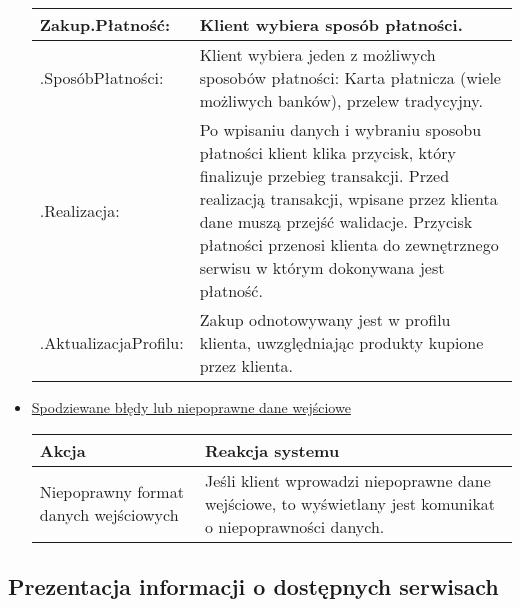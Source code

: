 \documentclass[a4paper,20pt]{article}
\begin{document}
\begin{itemize}
\begin{center}
\begin{tabularx}{\textwidth}[t]{XX}
\arrayrulecolor{black}\hline
\textbf{Zakup.Płatność:} & \textbf{Klient wybiera sposób płatności.} \\

\hline

\quad .SposóbPłatności: & 
\begin{minipage}[t]{\linewidth}%
Klient wybiera jeden z możliwych sposobów płatności: Karta płatnicza (wiele możliwych banków), przelew tradycyjny. 
\end{minipage}\\

\quad .Realizacja: & 
\begin{minipage}[t]{\linewidth}%
Po wpisaniu danych i wybraniu sposobu płatności klient klika przycisk, który finalizuje przebieg transakcji. Przed realizacją transakcji, wpisane przez klienta dane muszą przejść walidacje. Przycisk płatności przenosi klienta do zewnętrznego serwisu w którym dokonywana jest płatność.  
\end{minipage}\\

\quad .AktualizacjaProfilu: & 
\begin{minipage}[t]{\linewidth}%
Zakup odnotowywany jest w profilu klienta, uwzględniając produkty kupione przez klienta.
\end{minipage}\\


\end{tabularx}
\end{center}


\item \underline{Spodziewane błędy lub niepoprawne dane wejściowe}


\begin{center}
\begin{tabular}{ | m{15em} | m{7cm} | } 
\hline
\textbf{Akcja} & \textbf{Reakcja systemu} \\ 
\hline
Niepoprawny format danych wejściowych & Jeśli klient wprowadzi niepoprawne dane wejściowe, to wyświetlany jest komunikat o niepoprawności danych.  \\ 
\hline
\end{tabular}
\end{center}

\end{itemize}




\subsection{Prezentacja informacji o dostępnych serwisach}
\end{document}

